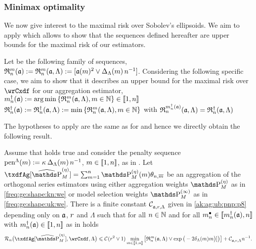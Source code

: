 \subsubsection{Minimax optimality}
We now give interest to the maximal risk over Sobolev's ellipsoids.
We aim to apply  which allows to show that the sequences defined hereafter are upper bounds for the maximal risk of our estimators.
\begin{de*}
  Let be the following family of sequences,
  $\daRa{\Di}{(\xdfCw[])}:=\daRa{\Di}{(\xdfCw[],\Lambda)}:=[\xdfCw^2\vee \DipenSv\,\ssY^{-1}]$.
Considering the following specific case, we aim to show that it describes an upper bound for the maximal risk over $\rwCxdf$ for our aggregation estimator,
    $\aDi{\ssY}(\xdfCw[]):=\argmin\Nset[\Di\in\Nz]{\daRa{\Di}{(\xdfCw[],\Lambda)}}\in\nset{1,\ssY}$\\
    $\naRa{(\xdfCw[])}:=\naRa{(\xdfCw[],\Lambda)}:=\min\Nset[\Di\in\Nz]{\daRa{\Di}{(\xdfCw[],\Lambda)}}$
    with $\daRa{\aDi{\ssY}(\xdfCw[])}{(\xdfCw[],\Lambda)}=\naRa{(\xdfCw[],\Lambda)}$
\assEnd
\end{de*}

The hypotheses to apply  are the same as for  and hence we directly obtain the following result.

\begin{thm}
Assume that  holds true and consider the penalty sequence $\penSv:=\penD$, $\Di\in\nset{1,n}$, as in .
Let $\txdfAg[{\erWe[]}]=\sum_{\Di=1}^{\ssY} \We\txdfPr$ be an aggregation of the orthogonal series estimators using either aggregation weights $\rWe[]$ as in \eqref{freq:ge:shape:kn:we} or model selection weights $\msWe[]$ as in \eqref{freq:ge:shape:uk:we}. %
There is a finite constant $\cst{\xdfCw[],\xdfCr,\Lambda}$ given in
\eqref{ak:ag:ub:pnp:p8} depending only on $\xdfCw[]$, $\xdfCr$ and $\Lambda$ such that for all
$\ssY\in\Nz$ and for all $\sDi{\ssY}\in\nset{\aDi{\ssY}(\xdfCw[]),\ssY}$  with
 $\aDi{\ssY}(\xdfCw[])\in\nset{1,n}$ as in  holds 
 \begin{equation}
 \nRi{\txdfAg[{\erWe[]}]}{\rwCxdf,\Lambda}
    \leq 
   \cst{}(\xdfCr^2\vee1)\min_{\Di\in\nset{1,\ssY}}\big[\daRa{\Di}{(\xdfCw[],\Lambda)}\vee\exp\big(-2\cmiSv\Di\big)]\big)\big]
   +\cst{\xdfCw[],\xdfCr,\Lambda}\ssY^{-1}.
\end{equation}
\reEnd
\end{thm}

